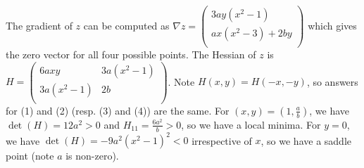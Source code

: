 \documentclass[a4paper, 11pt]{exam}
\begin{document}
\begin{questions}
\begin{parts}
        \part \qonequestion\qonechoices
    \end{parts}
    \begin{solution}
        The gradient of $z$ can be computed as $\nabla z = 
        \begin{pmatrix}
            3ay(x^2 - 1) \\
            ax(x^2-3) +2by \\      
        \end{pmatrix}$
        which gives the zero vector for all four possible points. The Hessian of $z$ is $H = 
        \begin{pmatrix}
            6axy & 3a(x^2 - 1) \\
            3a(x^2 - 1) & 2b \\
        \end{pmatrix}$. Note $H(x,y) = H(-x, -y)$, so answers for (1) and (2) (resp. (3) and (4)) are the same. For $(x, y) = (1, \frac{a}{b})$, we have $\det(H) = 12a^2 > 0$ and $H_{11} = \frac{6a^2}{b} > 0$, so we have a local minima. For $y = 0$, we have $\det(H) = -9a^2(x^2-1)^2 < 0$ irrespective of $x$, so we have a saddle point (note $a$ is non-zero).
    \end{solution}

    

\end{questions}
\end{document}

